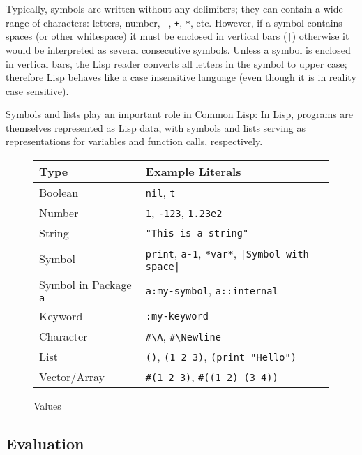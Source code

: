\documentclass[a4paper]{amsart}
\begin{document}
Typically, symbols are written without any delimiters; they can
contain a wide range of characters: letters, number, \verb|-|,
\verb|+|, \verb|*|, etc. However, if a symbol contains spaces (or
other whitespace) it must be enclosed in vertical bars (\verb=|=)
otherwise it would be interpreted as several consecutive symbols.
Unless a symbol is enclosed in vertical bars, the Lisp reader converts
all letters in the symbol to upper case; therefore Lisp behaves like a
case insensitive language (even though it is in reality case
sensitive).

Symbols and lists play an important role in Common Lisp: In Lisp,
programs are themselves represented as Lisp data, with symbols and
lists serving as representations for variables and function calls,
respectively.

\begin{figure}[tp]
  \centering
  \begin{tabular}{|l|l|}
    \hline
    Type& Example Literals\\
    \hline\hline
    Boolean & \texttt{nil}, \texttt{t}\\
    \hline
    Number & \texttt{1}, \texttt{-123}, \texttt{1.23e2}\\
    \hline
    String & \verb|"This is a string"|\\
    \hline
    Symbol & \verb|print|, \verb|a-1|, \verb|*var*|, \verb=|Symbol with space|=\\
    \hline
    Symbol in Package \texttt{a} & \verb|a:my-symbol|, \verb|a::internal|\\
    \hline
    Keyword & \verb|:my-keyword|\\
    \hline
    Character & \verb|#\A|, \verb|#\Newline|\\
    \hline
    List & \verb|()|, \verb|(1 2 3)|, \verb|(print "Hello")|\\
    \hline
    Vector/Array & \verb|#(1 2 3)|, \verb|#((1 2) (3 4))|\\
    \hline
  \end{tabular}
  \caption{Values}
  \label{fig:value-literals}
\end{figure}

\subsection{Evaluation}
\label{sec:evaluation}
\end{document}
